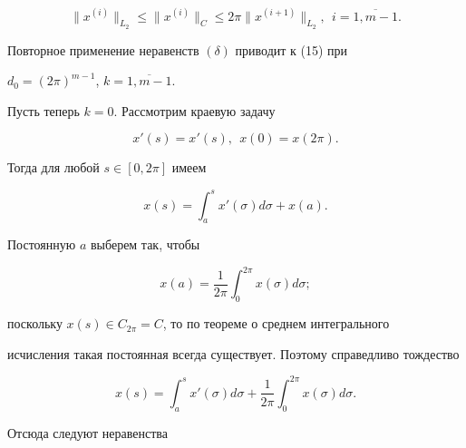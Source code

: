 \begin{equation}


\| x^{(i)} \|_{L_2} \leq \| x^{(i)} \|_{C} \leq 2 \pi \|


x^{(i+1)} \|_{L_2},\ \ i={\overline{1,m-1}}.


\tag{$\delta$}


\end{equation}





Повторное применение неравенств $(\delta)$ приводит к (15) при 


$d_0=(2 \pi)^{m-1}$, $k={\overline{1,m-1}}$.





Пусть теперь $k=0$. Рассмотрим краевую задачу


\begin{equation}


x'(s)=x'(s),\ \ x(0)=x(2 \pi).


\tag{$\ve$}


\end{equation}


Тогда для любой $s \in [0,2 \pi]$ имеем


\begin{equation}


x(s)=\int_{a}^{s} x'( \sigma) d \sigma + x(a).


\tag{$\mu$}


\end{equation}


Постоянную $a$ выберем так, чтобы


$$


x(a)=\frac{1}{2 \pi} \int_{0}^{2 \pi} x( \sigma) d \sigma;


$$


поскольку $x(s) \in C_{2 \pi}=C$, то по теореме о среднем интегрального


исчисления такая постоянная всегда существует. Поэтому справедливо тождество


\begin{equation}


x(s)=\int_{a}^{s} x'( \sigma) d \sigma + \frac{1}{2 \pi} \int_{0}^{2 \pi}


x( \sigma) d \sigma.


\tag{$\mu'$}


\end{equation}


Отсюда следуют неравенства


